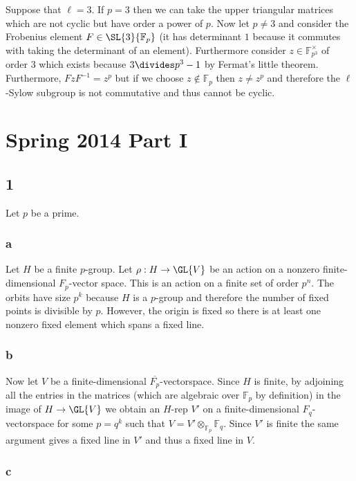 \documentclass[12pt]{article}
\renewcommand{\F}{\mathbb{F}}
\begin{document}
Suppose that $\ell = 3$. If $p = 3$ then we can take the upper triangular matrices which are not cyclic but have order a power of $p$. Now let $p \neq 3$ and consider the Frobenius element $F \in \SL{3}{\F_p}$ (it has determinant $1$ because it commutes with taking the determinant of an element). Furthermore consider $z \in \F_{p^3}^\times$ of order $3$ which exists because $3 \divides p^3 - 1$ by Fermat's little theorem. Furthermore, $F z F^{-1} = z^p$ but if we choose $z \notin \F_p$ then $z \neq z^p$ and therefore the $\ell$-Sylow subgroup is not commutative and thus cannot be cyclic.

\section{Spring 2014 Part I}

\subsection{1}

Let $p$ be a prime.

\subsubsection{a}

Let $H$ be a finite $p$-group. Let $\rho : H \to \GL{V}$ be an action on a nonzero finite-dimensional $F_p$-vector space. This is an action on a finite set of order $p^n$. The orbits have size $p^k$ because $H$ is a $p$-group and therefore the number of fixed points is divisible by $p$. However, the origin is fixed so there is at least one nonzero fixed element which spans a fixed line.

\subsubsection{b}

Now let $V$ be a finite-dimensional $\overline{F_p}$-vectorspace. Since $H$ is finite, by adjoining all the entries in the matrices (which are algebraic over $\F_p$ by definition) in the image of $H \to \GL{V}$ we obtain an $H$-rep $V'$ on a finite-dimensional $F_q$-vectorspace for some $p = q^k$ such that $V = V' \otimes_{\F_p} \F_q$. Since $V'$ is finite the same argument gives a fixed line in $V'$ and thus a fixed line in $V$.

\subsubsection{c}
\end{document}
